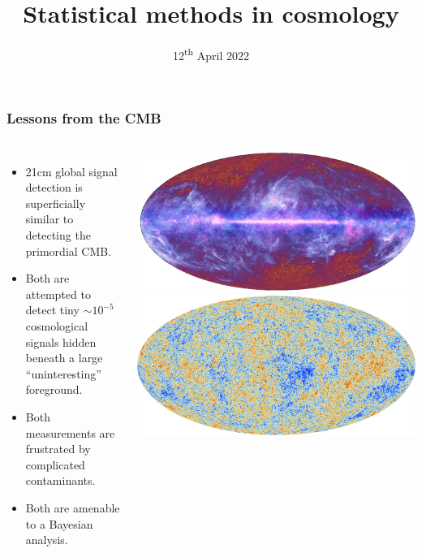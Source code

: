 \documentclass[aspectratio=169]{beamer}
\title{Statistical methods in cosmology}
\date{12\textsuperscript{th} April 2022}
\begin{document}
\begin{frame}
    \titlepage
\end{frame}

\begin{frame}
    \frametitle{Lessons from the CMB}
    \begin{columns}
        \begin{itemize}
            \item 21cm global signal detection is superficially similar to detecting the primordial CMB.
            \item Both are attempted to detect tiny $\sim 10^{-5}$ cosmological signals hidden beneath a large ``uninteresting'' foreground.
            \item Both measurements are frustrated by complicated contaminants.
            \item Both are amenable to a Bayesian analysis.
        \end{itemize}
        \includegraphics[width=\textwidth]{figures/9HXKAsNw5LtSRHFPWfeqiB.jpg}
        \includegraphics[width=\textwidth]{figures/Planck_satellite_cmb.jpg}

    \end{columns}
\end{frame}
\end{document}
